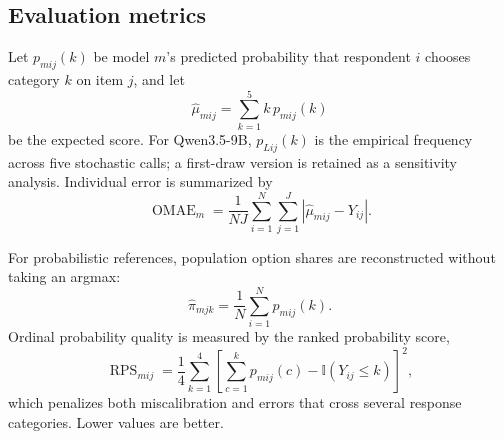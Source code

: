 \documentclass[11pt]{article}
\newcommand{\RPS}{\operatorname{RPS}}
\begin{document}
\subsection{Evaluation metrics}

Let $p_{mij}(k)$ be model $m$'s predicted probability that respondent $i$ chooses category $k$ on item $j$, and let
\begin{equation}
    \widehat{\mu}_{mij}
    =
    \sum_{k=1}^{5} k\,p_{mij}(k)
    \label{eq:expected-score}
\end{equation}
be the expected score. For Qwen3.5-9B, $p_{Lij}(k)$ is the empirical frequency across five stochastic calls; a first-draw version is retained as a sensitivity analysis. Individual error is summarized by
\begin{equation}
    \operatorname{OMAE}_{m}
    =
    \frac{1}{N J}
    \sum_{i=1}^{N}\sum_{j=1}^{J}
    \left|
    \widehat{\mu}_{mij}-Y_{ij}
    \right|.
    \label{eq:omae}
\end{equation}

For probabilistic references, population option shares are reconstructed without taking an argmax:
\begin{equation}
    \widehat{\pi}_{mjk}=\frac{1}{N}\sum_{i=1}^{N}p_{mij}(k).
    \label{eq:aggregate-probability}
\end{equation}
Ordinal probability quality is measured by the ranked probability score,
\begin{equation}
    \RPS_{mij}=\frac{1}{4}\sum_{k=1}^{4}
    \left[
    \sum_{c=1}^{k}p_{mij}(c)-\mathbb{I}(Y_{ij}\leq k)
    \right]^2,
    \label{eq:rps}
\end{equation}
which penalizes both miscalibration and errors that cross several response categories. Lower values are better.
\end{document}
